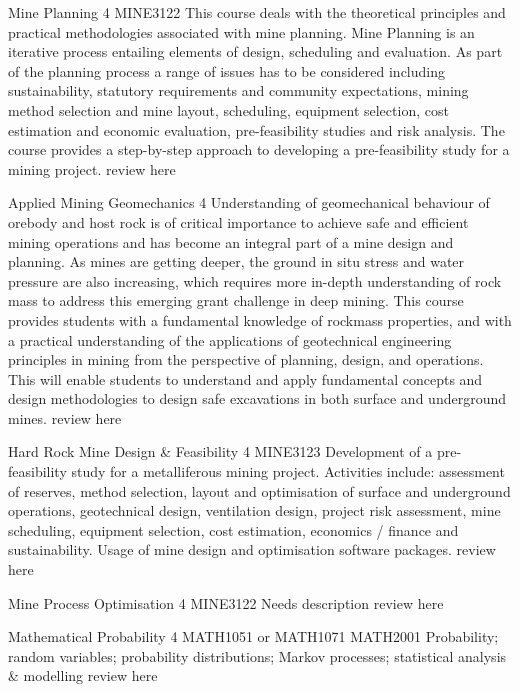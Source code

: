 	{Mine Planning}
	{4}
	{}
	{MINE3122}
	{}
	{This course deals with the theoretical principles and practical methodologies associated with mine planning. Mine Planning is an iterative process entailing elements of design, scheduling and evaluation. As part of the planning process a range of issues has to be considered including sustainability, statutory requirements and community expectations, mining method selection and mine layout, scheduling, equipment selection, cost estimation and economic evaluation, pre-feasibility studies and risk analysis. The course provides a step-by-step approach to developing a pre-feasibility study for a mining project.}
	{review here}

	{Applied Mining Geomechanics}
	{4}
	{}
	{}
	{}
	{Understanding of geomechanical behaviour of orebody and host rock is of critical importance to achieve safe and efficient mining operations and has become an integral part of a mine design and planning. As mines are getting deeper, the ground in situ stress and water pressure are also increasing, which requires more in-depth understanding of rock mass to address this emerging grant challenge in deep mining. This course provides students with a fundamental knowledge of rockmass properties, and with a practical understanding of the applications of geotechnical engineering principles in mining from the perspective of planning, design, and operations. This will enable students to understand and apply fundamental concepts and design methodologies to design safe excavations in both surface and underground mines.}
	{review here}

	{Hard Rock Mine Design \& Feasibility}
	{4}
	{}
	{MINE3123}
	{}
	{Development of a pre-feasibility study for a metalliferous mining project. Activities include: assessment of reserves, method selection, layout and optimisation of surface and underground operations, geotechnical design, ventilation design, project risk assessment, mine scheduling, equipment selection, cost estimation, economics / finance and sustainability. Usage of mine design and optimisation software packages.}
	{review here}

	{Mine Process Optimisation}
	{4}
	{}
	{MINE3122}
	{}
	{Needs description}
	{review here}

	{Mathematical Probability}
	{4}
	{MATH1051 or MATH1071}
	{}
	{MATH2001}
	{Probability; random variables; probability distributions; Markov processes; statistical analysis \& modelling}
	{review here}


